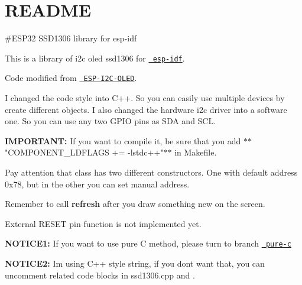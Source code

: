 \chapter{README}
\hypertarget{md_components_2_display_2_r_e_a_d_m_e}{}\label{md_components_2_display_2_r_e_a_d_m_e}
\#\+ESP32   SSD1306 library for esp-\/idf

This is a library of i2c oled ssd1306 for \href{https://github.com/espressif/esp-idf}{\texttt{ esp-\/idf}}.

Code modified from \href{https://github.com/baoshi/ESP-I2C-OLED}{\texttt{ ESP-\/\+I2\+C-\/\+OLED}}.

I changed the code style into C++. So you can easily use multiple devices by create different objects. I also changed the hardware i2c driver into a software one. So you can use any two GPIO pins as SDA and SCL.

{\bfseries{IMPORTANT\+:}} If you want to compile it, be sure that you add \texorpdfstring{$\ast$}{*}\texorpdfstring{$\ast$}{*}"{}\+COMPONENT\+\_\+\+LDFLAGS += -\/lstdc++"{}\texorpdfstring{$\ast$}{*}\texorpdfstring{$\ast$}{*} in Makefile.

Pay attention that  class has two different constructors. One with default  address 0x78, but in the other you can set manual address.

Remember to call {\bfseries{refresh}} after you draw something new on the screen.

External RESET pin function is not implemented yet.

{\bfseries{NOTICE1\+:}} If you want to use pure C method, please turn to branch \href{https://github.com/imxieyi/esp32-i2c-ssd1306-oled/tree/pure-c}{\texttt{ pure-\/c}}

{\bfseries{NOTICE2\+:}} I\textquotesingle{}m using C++ style string, if you don\textquotesingle{}t want that, you can uncomment related code blocks in ssd1306.\+cpp and . 